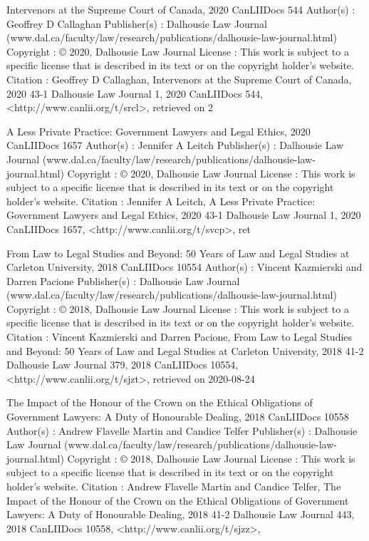 Intervenors at the Supreme Court of Canada, 2020 CanLIIDocs 544
Author(s) : 	Geoffrey D Callaghan
Publisher(s) : 	Dalhousie Law Journal (www.dal.ca/faculty/law/research/publications/dalhousie-law-journal.html)
Copyright : 	© 2020, Dalhousie Law Journal
License : 	This work is subject to a specific license that is described in its text or on the copyright holder's website.
Citation : 	Geoffrey D Callaghan, Intervenors at the Supreme Court of Canada, 2020 43-1 Dalhousie Law Journal 1, 2020 CanLIIDocs 544, <http://www.canlii.org/t/srcl>, retrieved on 2



A Less Private Practice: Government Lawyers and Legal Ethics, 2020 CanLIIDocs 1657
Author(s) : 	Jennifer A Leitch
Publisher(s) : 	Dalhousie Law Journal (www.dal.ca/faculty/law/research/publications/dalhousie-law-journal.html)
Copyright : 	© 2020, Dalhousie Law Journal
License : 	This work is subject to a specific license that is described in its text or on the copyright holder's website.
Citation : 	Jennifer A Leitch, A Less Private Practice: Government Lawyers and Legal Ethics, 2020 43-1 Dalhousie Law Journal 1, 2020 CanLIIDocs 1657, <http://www.canlii.org/t/svcp>, ret



From Law to Legal Studies and Beyond: 50 Years of Law and Legal Studies at Carleton University, 2018 CanLIIDocs 10554
Author(s) : 	Vincent Kazmierski and Darren Pacione
Publisher(s) : 	Dalhousie Law Journal (www.dal.ca/faculty/law/research/publications/dalhousie-law-journal.html)
Copyright : 	© 2018, Dalhousie Law Journal
License : 	This work is subject to a specific license that is described in its text or on the copyright holder's website.
Citation : 	Vincent Kazmierski and Darren Pacione, From Law to Legal Studies and Beyond: 50 Years of Law and Legal Studies at Carleton University, 2018 41-2 Dalhousie Law Journal 379, 2018 CanLIIDocs 10554, <http://www.canlii.org/t/sjzt>, retrieved on 2020-08-24



The Impact of the Honour of the Crown on the Ethical Obligations of Government Lawyers: A Duty of Honourable Dealing, 2018 CanLIIDocs 10558
Author(s) : 	Andrew Flavelle Martin and Candice Telfer
Publisher(s) : 	Dalhousie Law Journal (www.dal.ca/faculty/law/research/publications/dalhousie-law-journal.html)
Copyright : 	© 2018, Dalhousie Law Journal
License : 	This work is subject to a specific license that is described in its text or on the copyright holder's website.
Citation : 	Andrew Flavelle Martin and Candice Telfer, The Impact of the Honour of the Crown on the Ethical Obligations of Government Lawyers: A Duty of Honourable Dealing, 2018 41-2 Dalhousie Law Journal 443, 2018 CanLIIDocs 10558, <http://www.canlii.org/t/sjzz>, 




